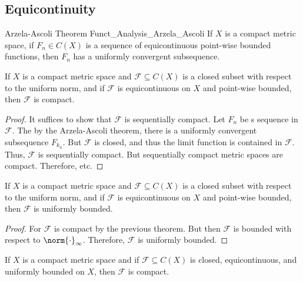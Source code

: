 \documentclass[crop=false,class=book,oneside]{standalone}                      %
\begin{document}
        \subsection{Equicontinuity}
            \begin{ltheorem}{Arzela-Ascoli Theorem}
                  {Funct_Analysis_Arzela_Ascoli}
                If $X$ is a compact metric space, if
                $F_{n}\in{C}(X)$ is a sequence of equicontinuous
                point-wise bounded functions, then $F_{n}$ has a
                uniformly convergent subsequence.
            \end{ltheorem}
            \begin{theorem}
                If $X$ is a compact metric space and
                $\mathscr{F}\subseteq{C}(X)$ is a closed subset with
                respect to the uniform norm, and if
                $\mathscr{F}$ is equicontinuous on $X$ and point-wise
                bounded, then $\mathscr{F}$ is compact.
            \end{theorem}
            \begin{proof}
                It suffices to show that $\mathscr{F}$ is sequentially
                compact. Let $F_{n}$ be s sequence in $\mathscr{F}$.
                The by the Arzela-Ascoli theorem, there is a uniformly
                convergent subsequence $F_{k_{n}}$. But $\mathscr{F}$
                is closed, and thus the limit function is contained
                in $\mathscr{F}$. Thus, $\mathscr{F}$ is sequentially
                compact. But sequentially compact metric spaces are
                compact. Therefore, etc.
            \end{proof}
            \begin{theorem}
                If $X$ is a compact metric space and
                $\mathscr{F}\subseteq{C}(X)$ is a closed subset with
                respect to the uniform norm, and if
                $\mathscr{F}$ is equicontinuous on $X$ and point-wise
                bounded, then $\mathscr{F}$ is uniformly bounded.
            \end{theorem}
            \begin{proof}
                For $\mathscr{F}$ is compact by the previous theorem.
                But then $\mathscr{F}$ is bounded with respect to
                $\norm{\cdot}_{\infty}$. Therefore, $\mathscr{F}$ is
                uniformly bounded.
            \end{proof}
            \begin{theorem}
                If $X$ is a compact metric space and if
                $\mathscr{F}\subseteq{C}(X)$ is closed, equicontinuous,
                and uniformly bounded on $X$, then $\mathscr{F}$ is
                compact.
            \end{theorem}
\end{document}
